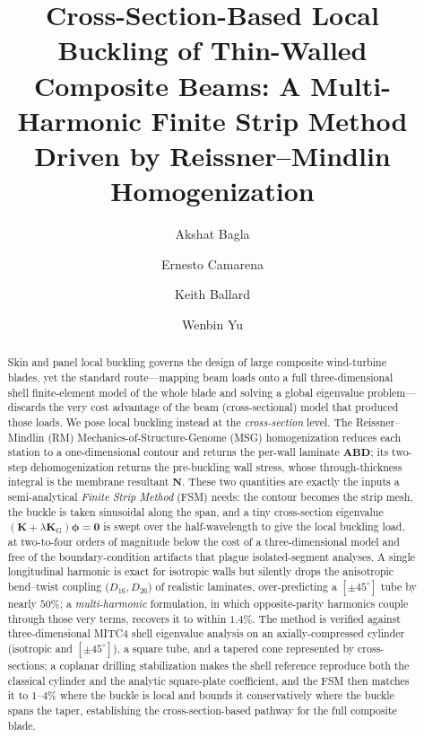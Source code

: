 \documentclass[preprint,12pt]{elsarticle}
\newcommand{\NN}{\mathbf{N}}
\newcommand{\Kmat}{\mathbf{K}}
\newcommand{\KG}{\mathbf{K}_{\mathrm{G}}}
\newcommand{\ABD}{\mathbf{ABD}}
\newcommand{\phivec}{\boldsymbol{\phi}}
\begin{document}
\begin{frontmatter}

\title{Cross-Section-Based Local Buckling of Thin-Walled Composite Beams:
A Multi-Harmonic Finite Strip Method Driven by Reissner--Mindlin Homogenization}

\author[purdue]{Akshat Bagla}
\author[snl]{Ernesto Camarena}
\author[afrl]{Keith Ballard}
\author[purdue]{Wenbin Yu}

\begin{abstract}
Skin and panel local buckling governs the design of large composite wind-turbine blades, yet the
standard route---mapping beam loads onto a full three-dimensional shell finite-element model of the whole
blade and solving a global eigenvalue problem---discards the very cost advantage of the beam
(cross-sectional) model that produced those loads. We pose local buckling instead at the
\emph{cross-section} level. The Reissner--Mindlin (RM) Mechanics-of-Structure-Genome (MSG)
homogenization reduces each station to a one-dimensional contour and returns the per-wall laminate
$\ABD$; its two-step dehomogenization returns the pre-buckling wall stress, whose through-thickness
integral is the membrane resultant $\NN$. These two quantities are exactly the inputs a semi-analytical
\emph{Finite Strip Method} (FSM) needs: the contour becomes the strip mesh, the buckle is taken sinusoidal
along the span, and a tiny cross-section eigenvalue $(\Kmat+\lambda\KG)\phivec=\bm0$ is swept over the
half-wavelength to give the local buckling load, at two-to-four orders of magnitude below the cost of a
three-dimensional model and free of the boundary-condition artifacts that plague isolated-segment
analyses. A single longitudinal harmonic is exact for isotropic walls but silently drops the anisotropic
bend--twist coupling ($D_{16},D_{26}$) of realistic laminates, over-predicting a $[\pm45^\circ]$ tube by
nearly $50\%$; a \emph{multi-harmonic} formulation, in which opposite-parity harmonics couple through those
very terms, recovers it to within $1.4\%$. The method is verified against three-dimensional MITC4 shell
eigenvalue analysis on an axially-compressed cylinder (isotropic and $[\pm45^\circ]$), a square tube, and a
tapered cone represented by cross-sections; a coplanar drilling stabilization makes the shell reference
reproduce both the classical cylinder and the analytic square-plate coefficient, and the FSM then matches it
to $1$--$4\%$ where the buckle is local and bounds it conservatively where the buckle spans the taper,
establishing the cross-section-based pathway for the full composite blade.
\end{abstract}


\end{frontmatter}
\end{document}
